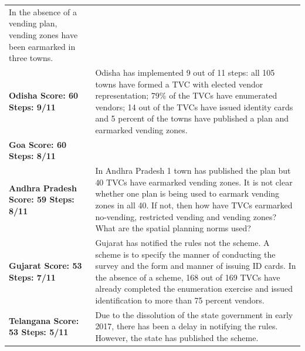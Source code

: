 \documentclass[a4paper, 12pt, twoside]{article}
\begin{document}
\begin{longtable}[l]{>{\raggedright}p{4cm}>{\raggedright\arraybackslash}p{10cm}}
In the absence of a vending plan, vending zones have been earmarked in three towns.
\\
\cellcolor{SVACgreen3}\bf{Odisha}
\newline
\bf{Score: 60}
\newline
\bf{Steps: 9/11}
&
\cellcolor{SVACgreen2}Odisha has implemented 9 out of 11 steps: all 105 towns have formed a TVC with elected vendor representation; 79\% of the TVCs have enumerated vendors; 14 out of the TVCs have issued identity cards and 5 percent of the towns have published a plan and earmarked vending zones.
\\
\cellcolor{SVACgreen3}\bf{Goa}
\newline
\bf{Score: 60}
\newline
\bf{Steps: 8/11}
&
\\
\cellcolor{SVACgreen3}\bf{Andhra Pradesh}
\newline
\bf{Score: 59}
\newline
\bf{Steps: 8/11}
&
\cellcolor{SVACgreen2}In Andhra Pradesh 1 town has published the plan but 40 TVCs have earmarked vending zones. It is not clear whether one plan is being used to earmark vending zones in all 40. If not, then how have TVCs earmarked no-vending, restricted vending and vending zones? What are the spatial planning norms used?
\\
\cellcolor{SVACgreen3}\bf{Gujarat}
\newline
\bf{Score: 53}
\newline
\bf{Steps: 7/11}
&
\cellcolor{SVACgreen2}Gujarat has notified the rules not the scheme. A scheme is to specify the manner of conducting the survey and the form and manner of issuing ID cards. In the absence of a scheme, 168 out of 169 TVCs have already completed the enumeration exercise and issued identification to more than 75 percent vendors.
\\
\cellcolor{SVACgreen3}\bf{Telangana}
\newline
\bf{Score: 53}
\newline
\bf{Steps: 5/11}
&
\cellcolor{SVACgreen2}Due to the dissolution of the state government in early 2017, there has been a delay in notifying the rules. However, the state has published the scheme.


\end{longtable}
\end{document}
